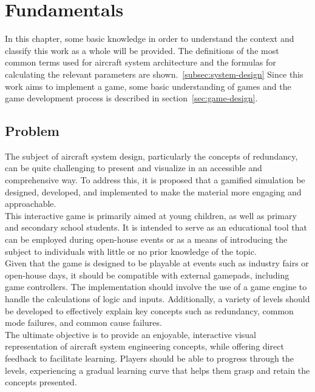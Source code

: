 \chapter{Fundamentals}\label{ch:fundamentals}
In this chapter, some basic knowledge in order to understand the context and classify this work as a whole will be provided.
The definitions of the most common terms used for aircraft system architecture and the formulas for calculating the relevant
parameters are shown.~\ref{subsec:system-design}
Since this work aims to implement a game, some basic understanding of games and the game development process is described in
section~\ref{sec:game-design}.

\section{Problem}\label{sec:problem}
The subject of aircraft system design, particularly the concepts of redundancy, can be quite challenging to present and visualize
in an accessible and comprehensive way.
To address this, it is proposed that a gamified simulation be designed, developed, and implemented to make the material
more engaging and approachable.
\\
This interactive game is primarily aimed at young children, as well as primary and secondary school students.
It is intended to serve as an educational tool that can be employed during open-house events or as a means of
introducing the subject to individuals with little or no prior knowledge of the topic.
\\
Given that the game is designed to be playable at events such as industry fairs or open-house days,
it should be compatible with external gamepads, including game controllers.
The implementation should involve the use of a game engine to handle the calculations of logic and inputs.
Additionally, a variety of levels should be developed to effectively explain key concepts such as redundancy, common mode failures, and common cause failures.
\\
The ultimate objective is to provide an enjoyable, interactive visual representation of aircraft system engineering concepts,
while offering direct feedback to facilitate learning.
Players should be able to progress through the levels, experiencing a gradual learning curve that helps them grasp and
retain the concepts presented.
